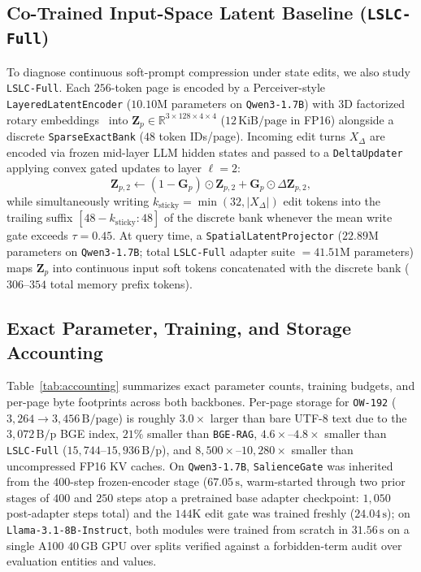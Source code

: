 \documentclass[10pt]{article}
\newcommand{\vect}[1]{\mathbf{#1}}
\renewcommand{\_}{\origunderscore\allowbreak}
\begin{document}
\subsection{Co-Trained Input-Space Latent Baseline (\texttt{LSLC-Full})}
To diagnose continuous soft-prompt compression under state edits, we also study \texttt{LSLC-Full}. Each $256$-token page is encoded by a Perceiver-style \texttt{Layered\allowbreak Latent\allowbreak Encoder} ($10.10\text{M}$ parameters on \texttt{Qwen3-1.7B}) with 3D factorized rotary embeddings~\citep{su2024roformer} into $\vect{Z}_p \in \mathbb{R}^{3 \times 128 \times 4 \times 4}$ ($12\,\text{KiB/page}$ in FP16) alongside a discrete \texttt{SparseExactBank} ($48$ token IDs/page). Incoming edit turns $X_\Delta$ are encoded via frozen mid-layer LLM hidden states and passed to a \texttt{DeltaUpdater} applying convex gated updates to layer $\ell=2$:
\begin{equation}
\vect{Z}_{p,2} \leftarrow (1 - \vect{G}_p)\odot \vect{Z}_{p,2} + \vect{G}_p \odot \Delta \vect{Z}_{p,2},
\end{equation}
while simultaneously writing $k_{\text{sticky}} = \min(32, |X_\Delta|)$ edit tokens into the trailing suffix $[48 - k_{\text{sticky}} : 48]$ of the discrete bank whenever the mean write gate exceeds $\tau = 0.45$. At query time, a \texttt{SpatialLatentProjector} ($22.89\text{M}$ parameters on \texttt{Qwen3-1.7B}; total \texttt{LSLC-Full} adapter suite $= 41.51\text{M}$ parameters) maps $\vect{Z}_p$ into continuous input soft tokens concatenated with the discrete bank ($306$--$354$ total memory prefix tokens).

\subsection{Exact Parameter, Training, and Storage Accounting}
Table~\ref{tab:accounting} summarizes exact parameter counts, training budgets, and per-page byte footprints across both backbones. Per-page storage for \texttt{OW-192} ($3{,}264 \rightarrow 3{,}456\,\text{B/page}$) is roughly $3.0\times$ larger than bare UTF-8 text due to the $3{,}072\,\text{B/p}$ BGE index, $21\%$ smaller than \texttt{BGE-RAG}, $4.6\times$--$4.8\times$ smaller than \texttt{LSLC-Full} ($15{,}744$--$15{,}936\,\text{B/p}$), and $8{,}500\times$--$10{,}280\times$ smaller than uncompressed FP16 KV caches. On \texttt{Qwen3-1.7B}, \texttt{SalienceGate} was inherited from the $400$-step frozen-encoder stage ($67.05\,\text{s}$, warm-started through two prior stages of $400$ and $250$ steps atop a pretrained base adapter checkpoint: $1{,}050$ post-adapter steps total) and the $144\text{K}$ edit gate was trained freshly ($24.04\,\text{s}$); on \texttt{Llama-3.1-8B-Instruct}, both modules were trained from scratch in $31.56\,\text{s}$ on a single A100 $40\,\text{GB}$ GPU over splits verified against a forbidden-term audit over evaluation entities and values.
\end{document}
